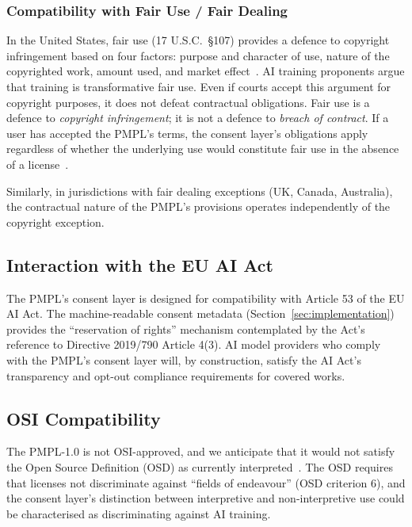 \documentclass[11pt,twocolumn]{article}
\begin{document}
\subsubsection{Compatibility with Fair Use / Fair Dealing}

In the United States, fair use (17 U.S.C.\ \S 107) provides a defence
to copyright infringement based on four factors: purpose and character
of use, nature of the copyrighted work, amount used, and market
effect~\cite{us-copyright-act}. AI training proponents argue that
training is transformative fair use. Even if courts accept this argument
for copyright purposes, it does not defeat contractual obligations.
Fair use is a defence to \emph{copyright infringement}; it is not a
defence to \emph{breach of contract}. If a user has accepted the PMPL's
terms, the consent layer's obligations apply regardless of whether the
underlying use would constitute fair use in the absence of a
license~\cite{davidson2004click}.

Similarly, in jurisdictions with fair dealing exceptions (UK, Canada,
Australia), the contractual nature of the PMPL's provisions operates
independently of the copyright exception.

\subsection{Interaction with the EU AI Act}

The PMPL's consent layer is designed for compatibility with Article 53 of
the EU AI Act. The machine-readable consent metadata
(Section~\ref{sec:implementation}) provides the ``reservation of rights''
mechanism contemplated by the Act's reference to Directive 2019/790
Article 4(3). AI model providers who comply with the PMPL's consent
layer will, by construction, satisfy the AI Act's transparency and
opt-out compliance requirements for covered works.

\subsection{OSI Compatibility}

The PMPL-1.0 is not OSI-approved, and we anticipate that it would not
satisfy the Open Source Definition (OSD) as currently
interpreted~\cite{perens1999osi}. The OSD requires that licenses not
discriminate against ``fields of endeavour'' (OSD criterion 6), and the
consent layer's distinction between interpretive and non-interpretive
use could be characterised as discriminating against AI training.
\end{document}
